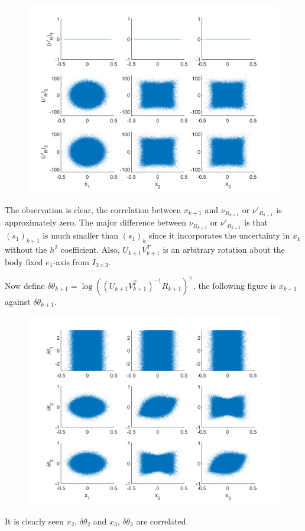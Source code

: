 \documentclass[10pt]{article}
\begin{document}
\begin{figure}[H]
	\centering
	\includegraphics{xvRprime}
\end{figure}

The observation is clear, the correlation between $x_{k+1}$ and $\nu_{R_{k+1}}$ or $\nu'_{R_{k+1}}$ is approximately zero.
The major difference between $\nu_{R_{k+1}}$ or $\nu'_{R_{k+1}}$ is that $(s_1)_{k+1}$ is much smaller than $(s_1)_k$ since it incorporates the uncertainty in $x_k$ without the $h^2$ coefficient.
Also, $U_{k+1}V_{k+1}^T$ is an arbitrary rotation about the body fixed $e_1$-axis from $I_{3\times 3}$.

Now define $\delta\theta_{k+1} = \log((U_{k+1}V_{k+1}^T)^{-1}R_{k+1})^\vee$, the following figure is $x_{k+1}$ against $\delta\theta_{k+1}$.

\begin{figure}[H]
	\centering
	\includegraphics{xtheta}
\end{figure}

It is clearly seen $x_2$, $\delta\theta_2$ and $x_3$, $\delta\theta_3$ are correlated.
\end{document}
